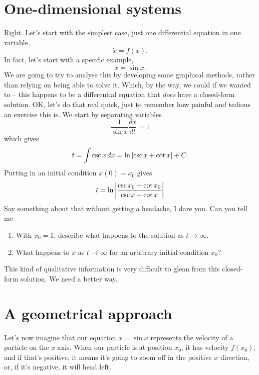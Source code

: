 \section{One-dimensional systems}
Right. Let's start with the simplest case, just one differential equation
in one variable,
\begin{equation*}
    \dot{x} = f(x).
\end{equation*}
In fact, let's start with a specific example,
\begin{equation*}
    \dot{x} = \sin x.
\end{equation*}
We are going to try to analyse this by developing some graphical methods,
rather than relying on being able to solve it. Which, by the way, we could
if we wanted to -- this happens to be a differential equation that
\emph{does} have a closed-form solution. OK, let's do that real quick, just
to remember how painful and tedious an exercise this is. We start by
separating variables
\begin{equation*}
    \frac{1}{\sin x}\frac{dx}{dt} = 1
\end{equation*}
which gives
\begin{equation*}
    t = \int \csc x \, dx = \ln \left\lvert\csc x + \cot x\right\rvert + C.
\end{equation*}
Putting in an initial condition $x(0) = x_0$ gives
\begin{equation*}
    t = \ln \left\lvert\frac{\csc{x_0} + \cot x_0}{\csc x + \cot x}\right\rvert
\end{equation*}
Say something about that without getting a headache, I dare you. Can you
tell me
\begin{enumerate}
    \item With $x_0 = 1$, describe what happens to the solution as $t \to
        \infty$.
    \item What happens to $x$ as $t \to \infty$ for an arbitrary initial
        condition $x_0$?
\end{enumerate}
This kind of qualitative information is very difficult to glean from this
closed-form solution. We need a better way.

\section{A geometrical approach}
Let's now imagine that our equation $\dot{x} = \sin x$ represents the
velocity of a particle on the $x$ axis. When our particle is at position
$x_0$, it has velocity $f(x_0)$, and if that's positive, it means it's
going to zoom off in the positive $x$ direction, or, if it's negative, it
will head left.

        

